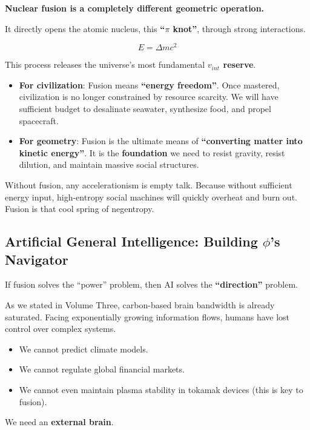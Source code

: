 \textbf{Nuclear fusion is a completely different geometric operation.}

It directly opens the atomic nucleus, this \textbf{``$\pi$ knot''}, through strong interactions.

\[E = \Delta m c^2\]

This process releases the universe's most fundamental \textbf{$v_{int}$ reserve}.

\begin{itemize}
\item \textbf{For civilization}: Fusion means \textbf{``energy freedom''}. Once mastered, civilization is no longer constrained by resource scarcity. We will have sufficient budget to desalinate seawater, synthesize food, and propel spacecraft.

\item \textbf{For geometry}: Fusion is the ultimate means of \textbf{``converting matter into kinetic energy''}. It is the \textbf{foundation} we need to resist gravity, resist dilution, and maintain massive social structures.
\end{itemize}

Without fusion, any accelerationism is empty talk. Because without sufficient energy input, high-entropy social machines will quickly overheat and burn out. Fusion is that cool spring of negentropy.

\subsection{Artificial General Intelligence: Building $\phi$'s Navigator}

If fusion solves the ``power'' problem, then AI solves the \textbf{``direction''} problem.

As we stated in Volume Three, carbon-based brain bandwidth is already saturated. Facing exponentially growing information flows, humans have lost control over complex systems.

\begin{itemize}
\item We cannot predict climate models.

\item We cannot regulate global financial markets.

\item We cannot even maintain plasma stability in tokamak devices (this is key to fusion).
\end{itemize}

We need an \textbf{external brain}.

